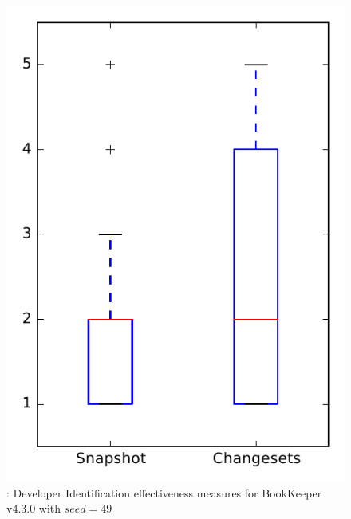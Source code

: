 
\begin{figure}
\centering
\includegraphics[height=0.4\textheight]{figures/dit_seed/rq1_bookkeeper_49}
\caption{\rtwo: Developer Identification effectiveness measures for BookKeeper v4.3.0 with $seed=49$}
\label{fig:dit_seed:rq1:bookkeeper}
\end{figure}
